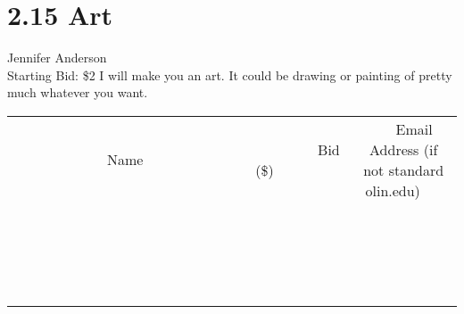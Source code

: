 \documentclass[11pt]{article}
\begin{document}
\section*{2.15 Art}
Jennifer Anderson
\\
Starting Bid: \$2
\newline
I will make you an art. It could be drawing or painting of pretty much whatever you want.
\\[3ex]
\begin{tabular}{c c c}
~~~~~~~~~~~~~Name~~~~~~~~~~~~~ & ~~~~~~~~~Bid (\$)~~~~~~~~~  & ~~~Email Address (if not standard olin.edu)~~~\\
 & & \\
\hline
 & & \\
\hline
 & & \\
\hline
 & & \\
\hline
 & & \\
\hline
 & & \\
\hline
 & & \\
\hline
 & & \\
\hline
 & & \\
\hline
 & & \\
\hline
 & & \\
\hline
 & & \\
\hline
 & & \\
\hline
 & & \\
\hline
 & & \\
\hline
 & & \\
\hline
 & & \\
\hline
 & & \\
\hline
 & & \\
\hline
\end{tabular}
\newpage
\end{document}

